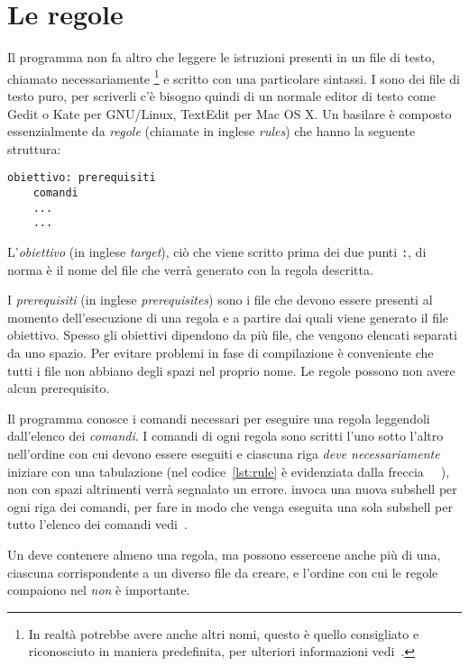 \section{Le regole}
\label{sec:le-regole}

Il programma  non fa altro che leggere le istruzioni presenti in
un file di testo, chiamato necessariamente
\footnote{In realtà potrebbe avere anche altri nomi, questo
  è quello consigliato e riconosciuto in maniera predefinita, per ulteriori
  informazioni vedi~\cite[pagina 12]{gnu:make}.}
e scritto con una particolare sintassi.  I  sono dei file di
testo puro, per scriverli c'è bisogno quindi di un normale editor di testo come
Gedit o Kate per GNU/Linux, TextEdit per Mac OS X.  Un 
basilare è composto essenzialmente da \emph{regole} (chiamate in inglese
\emph{rules}) che hanno la seguente struttura:
\begin{lstlisting}[showtabs=true,tab=\rightarrowfill,caption={Struttura di una
regola.},label=lst:rule]
obiettivo: prerequisiti
	comandi
	...
	...
\end{lstlisting}
L'\emph{obiettivo} (in inglese \emph{target}), ciò che viene scritto prima dei
due punti \texttt{:}, di norma è il nome del file che verrà generato con la
regola descritta.

I \emph{prerequisiti} (in inglese \emph{prerequisites}) sono i file che devono
essere presenti al momento dell'esecuzione di una regola e a partire dai quali
viene generato il file obiettivo.  Spesso gli obiettivi dipendono da più file,
che vengono elencati separati da uno spazio.  Per evitare problemi in fase di
compilazione è conveniente che tutti i file non abbiano degli spazi nel proprio
nome.  Le regole possono non avere alcun prerequisito.

Il programma  conosce i comandi necessari per eseguire una
regola leggendoli dall'elenco dei \emph{comandi}.  I comandi di ogni regola sono
scritti l'uno sotto l'altro nell'ordine con cui devono essere eseguiti e
ciascuna riga \emph{deve necessariamente} iniziare con una tabulazione (nel
codice~\ref{lst:rule} è evidenziata dalla freccia
\lstinline[showtabs=true,tab=\rightarrowfill]{	}), non con spazi altrimenti
verrà segnalato un errore.   invoca una nuova subshell per ogni
riga dei comandi, per fare in modo che venga eseguita una sola subshell per
tutto l'elenco dei comandi vedi~\cite[pagina 44]{gnu:make}.

Un  deve contenere almeno una regola, ma possono essercene
anche più di una, ciascuna corrispondente a un diverso file da creare, e
l'ordine con cui le regole compaiono nel  \emph{non} è
importante.

